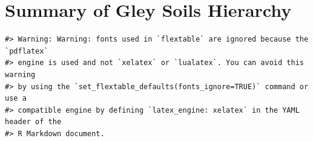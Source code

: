 \documentclass[
  letterpaper,
  DIV=11,
  numbers=noendperiod]{scrreprt}
\begin{document}
\hypertarget{sec-sum-G}{%
\section{Summary of Gley Soils Hierarchy}\label{sec-sum-G}}

\begin{verbatim}
#> Warning: Warning: fonts used in `flextable` are ignored because the `pdflatex`
#> engine is used and not `xelatex` or `lualatex`. You can avoid this warning
#> by using the `set_flextable_defaults(fonts_ignore=TRUE)` command or use a
#> compatible engine by defining `latex_engine: xelatex` in the YAML header of the
#> R Markdown document.
\end{verbatim}

\providecommand{\docline}[3]{\noalign{\global\setlength{\arrayrulewidth}{#1}}\arrayrulecolor[HTML]{#2}\cline{#3}}

\setlength{\tabcolsep}{2pt}

\renewcommand*{\arraystretch}{1.5}
\end{document}
